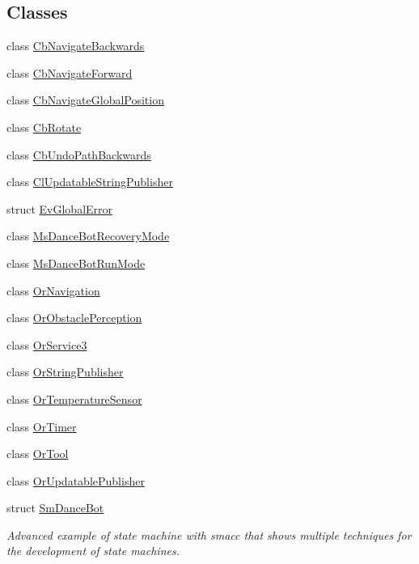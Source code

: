 \subsection*{Classes}
\begin{DoxyCompactItemize}
\item 
class \hyperlink{classsm__dance__bot_1_1CbNavigateBackwards}{Cb\+Navigate\+Backwards}
\item 
class \hyperlink{classsm__dance__bot_1_1CbNavigateForward}{Cb\+Navigate\+Forward}
\item 
class \hyperlink{classsm__dance__bot_1_1CbNavigateGlobalPosition}{Cb\+Navigate\+Global\+Position}
\item 
class \hyperlink{classsm__dance__bot_1_1CbRotate}{Cb\+Rotate}
\item 
class \hyperlink{classsm__dance__bot_1_1CbUndoPathBackwards}{Cb\+Undo\+Path\+Backwards}
\item 
class \hyperlink{classsm__dance__bot_1_1ClUpdatableStringPublisher}{Cl\+Updatable\+String\+Publisher}
\item 
struct \hyperlink{structsm__dance__bot_1_1EvGlobalError}{Ev\+Global\+Error}
\item 
class \hyperlink{classsm__dance__bot_1_1MsDanceBotRecoveryMode}{Ms\+Dance\+Bot\+Recovery\+Mode}
\item 
class \hyperlink{classsm__dance__bot_1_1MsDanceBotRunMode}{Ms\+Dance\+Bot\+Run\+Mode}
\item 
class \hyperlink{classsm__dance__bot_1_1OrNavigation}{Or\+Navigation}
\item 
class \hyperlink{classsm__dance__bot_1_1OrObstaclePerception}{Or\+Obstacle\+Perception}
\item 
class \hyperlink{classsm__dance__bot_1_1OrService3}{Or\+Service3}
\item 
class \hyperlink{classsm__dance__bot_1_1OrStringPublisher}{Or\+String\+Publisher}
\item 
class \hyperlink{classsm__dance__bot_1_1OrTemperatureSensor}{Or\+Temperature\+Sensor}
\item 
class \hyperlink{classsm__dance__bot_1_1OrTimer}{Or\+Timer}
\item 
class \hyperlink{classsm__dance__bot_1_1OrTool}{Or\+Tool}
\item 
class \hyperlink{classsm__dance__bot_1_1OrUpdatablePublisher}{Or\+Updatable\+Publisher}
\item 
struct \hyperlink{structsm__dance__bot_1_1SmDanceBot}{Sm\+Dance\+Bot}
\begin{DoxyCompactList}\small\item\em Advanced example of state machine with smacc that shows multiple techniques for the development of state machines. \end{DoxyCompactList}\item 

\end{DoxyCompactItemize}

